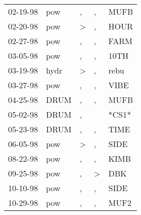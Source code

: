 \begin{supertabular}{p{0.07\textwidth}p{0.06\textwidth}p{0.02\textwidth}p{0.02\textwidth}p{0.06\textwidth}}
          02-19-98\textsuperscript{} &            pow\textsuperscript{} &             , &             , &           MUFB\textsuperscript{} \\
          02-20-98\textsuperscript{} &            pow\textsuperscript{} &  \textgreater &             , &           HOUR\textsuperscript{} \\
          02-27-98\textsuperscript{} &            pow\textsuperscript{} &             , &             , &           FARM\textsuperscript{} \\
          03-05-98\textsuperscript{} &            pow\textsuperscript{} &             , &             , &           10TH\textsuperscript{} \\
          03-19-98\textsuperscript{} &           hydr\textsuperscript{} &  \textgreater &             , &           rebu\textsuperscript{} \\
          03-27-98\textsuperscript{} &            pow\textsuperscript{} &             , &             , &           VIBE\textsuperscript{} \\
          04-25-98\textsuperscript{} &           DRUM\textsuperscript{} &             , &             , &           MUFB\textsuperscript{} \\
          05-02-98\textsuperscript{} &           DRUM\textsuperscript{} &             , &               &                            *CS1* \\
          05-23-98\textsuperscript{} &           DRUM\textsuperscript{} &             , &             , &           TIME\textsuperscript{} \\
          06-05-98\textsuperscript{} &            pow\textsuperscript{} &  \textgreater &             , &           SIDE\textsuperscript{} \\
          08-22-98\textsuperscript{} &            pow\textsuperscript{} &             , &             , &           KIMB\textsuperscript{} \\
          09-25-98\textsuperscript{} &            pow\textsuperscript{} &             , &  \textgreater &            DBK\textsuperscript{} \\
          10-10-98\textsuperscript{} &            pow\textsuperscript{} &             , &             , &           SIDE\textsuperscript{} \\
          10-29-98\textsuperscript{} &            pow\textsuperscript{} &             , &             , &           MUF2\textsuperscript{} \\

\end{supertabular}
